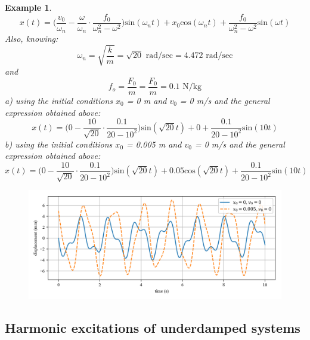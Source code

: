 \documentclass[12pt,letter]{article}
\newtheorem{ex}{Example}
\numberwithin{ex}{section} %
\newenvironment{example}{\begin{mdframed}[middlelinewidth=0.5mm]\begin{ex}\normalfont}{\end{ex}\end{mdframed}}
\begin{document}
\begin{example}
			\begin{equation}
				x(t) = \Big(\frac{v_0}{\omega_n}-\frac{\omega}{\omega_n}\cdot \frac{f_0}{\omega_n^2-\omega^2}\Big)\text{sin}(\omega_n t) + x_0\text{cos}(\omega_n t) + \frac{f_0}{\omega_n^2-\omega^2}\text{sin}(\omega t)
			\end{equation}								
			Also, knowing:
			\begin{equation}
				\omega_n = \sqrt{\frac{k}{m}} = \sqrt{20} \text{ rad/sec} =  4.472 \text{ rad/sec}
			\end{equation}				
			and
			\begin{equation}
				f_o = \frac{F_0}{m} = \frac{F_0}{m} = 0.1 \text{ N/kg}
			\end{equation}	
			a) using the initial conditions $x_0$ = 0 m and $v_0$ = 0 m/s and the general expression obtained above:
			\begin{equation}
				x(t) = \Big(0-\frac{10}{\sqrt{20}}\cdot \frac{0.1}{20-10^2}\Big)\text{sin}(\sqrt{20} t) + 0 + \frac{0.1}{20-10^2}\text{sin}(10 t)
			\end{equation}			
			b) using the initial conditions $x_0$ = 0.005 m and $v_0$ = 0 m/s and the general expression obtained above:
			\begin{equation}
				x(t) = \Big(0-\frac{10}{\sqrt{20}}\cdot \frac{0.1}{20-10^2}\Big)\text{sin}(\sqrt{20} t) + 0.05\text{cos}(\sqrt{20} t) + \frac{0.1}{20-10^2}\text{sin}(10 t)
			\end{equation}			
			\begin{figure}[H]
				\centering
				\includegraphics[width=1.0\textwidth]{../Figures/topic_6_example_2.png}
			\end{figure}
\end{example}


	
		\subsection{Harmonic excitations of underdamped systems}
\end{document}
